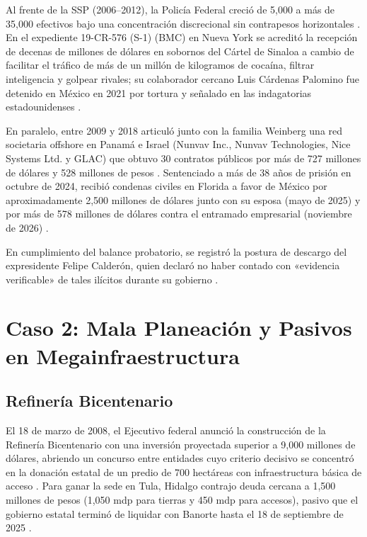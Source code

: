 \documentclass[12pt,letterpaper,oneside]{article}
\begin{document}
Al frente de la SSP (2006--2012), la Policía Federal creció de 5,000 a más de 35,000 efectivos bajo una concentración discrecional sin contrapesos horizontales \citep{astorga2015,lopezayllon2009}. En el expediente 19-CR-576 (S-1) (BMC) en Nueva York se acreditó la recepción de decenas de millones de dólares en sobornos del Cártel de Sinaloa a cambio de facilitar el tráfico de más de un millón de kilogramos de cocaína, filtrar inteligencia y golpear rivales; su colaborador cercano Luis Cárdenas Palomino fue detenido en México en 2021 por tortura y señalado en las indagatorias estadounidenses \citep{doj2024garcialuna,insightcrime2023}.

En paralelo, entre 2009 y 2018 articuló junto con la familia Weinberg una red societaria offshore en Panamá e Israel (Nunvav Inc., Nunvav Technologies, Nice Systems Ltd. y GLAC) que obtuvo 30 contratos públicos por más de 727 millones de dólares y 528 millones de pesos \citep{mcci2023,castilloj2026}. Sentenciado a más de 38 años de prisión en octubre de 2024, recibió condenas civiles en Florida a favor de México por aproximadamente 2,500 millones de dólares junto con su esposa (mayo de 2025) y por más de 578 millones de dólares contra el entramado empresarial (noviembre de 2026) \citep{uif2025,uif2026,guillen2025}.

En cumplimiento del balance probatorio, se registró la postura de descargo del expresidente Felipe Calderón, quien declaró no haber contado con «evidencia verificable» de tales ilícitos durante su gobierno \citep{infobae2024}.

\clearpage

\section{Caso 2: Mala Planeación y Pasivos en Megainfraestructura}
\subsection{Refinería Bicentenario}

El 18 de marzo de 2008, el Ejecutivo federal anunció la construcción de la Refinería Bicentenario con una inversión proyectada superior a 9,000 millones de dólares, abriendo un concurso entre entidades cuyo criterio decisivo se concentró en la donación estatal de un predio de 700 hectáreas con infraestructura básica de acceso \citep{asf2015,asf2016,montoya2014}. Para ganar la sede en Tula, Hidalgo contrajo deuda cercana a 1,500 millones de pesos (1,050 mdp para tierras y 450 mdp para accesos), pasivo que el gobierno estatal terminó de liquidar con Banorte hasta el 18 de septiembre de 2025 \citep{periodicohidalgo2025}.
\end{document}
